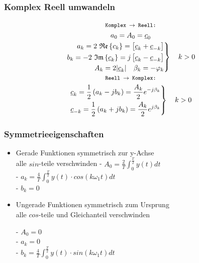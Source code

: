 \subsubsection{Komplex Reell umwandeln}
\begin{mdframed}[style=exercise]
    \begin{gather*}
    \texttt{\footnotesize Komplex $\rightarrow$ Reell:}\\
                a_0 = A_0 = \underline{c}_0\\
                \left.
                \begin{split}
                    a_k = 2\ \mathfrak{Re}\left\{ c_k \right\}= \left[ \underline{c}_k+\underline{c}_{-k} \right]\\
                    b_k = -2\ \mathfrak{Im}\left\{ \underline{c}_k \right\}= j\left[ \underline{c}_k-\underline{c}_{-k} \right]\\
                    A_k = 2|\underline{c}_k| \quad \beta_k = -\varphi_k
                \end{split}\right\} \quad k>0\\
    \texttt{\footnotesize Reell $\rightarrow$ Komplex:}\\
                \left.
                \begin{split}
                    \underline{c}_k = \frac{1}{2}\left( a_k-jb_k \right) = \frac{A_k}{2} e^{-j\beta_k}\\
                    \underline{c}_{-k} = \frac{1}{2}\left( a_k+jb_k \right) = \frac{A_k}{2} e^{j\beta_k}
                \end{split}\right\} \quad k>0\\
    \end{gather*}
\end{mdframed}

\subsubsection{Symmetrieeigenschaften}
\begin{itemize}
    \item Gerade Funktionen
        symmetrisch zur y-Achse\\
        alle $sin$-teile verschwinden
        - $A_0 = \frac{2}{T}\int^{\frac{T}{2}}_{0} y(t)dt$\\
        - $a_{k} = \frac{4}{T}\int^{\frac{T}{2}}_{0}y(t)\cdot cos(k\omega_1t)dt$\\
        - $b_k = 0$\\
    \item Ungerade Funktionen
        symmetrisch zum Ursprung\\
        alle $cos$-teile und Gleichanteil verschwinden

        - $A_0 = 0$\\
        - $a_k = 0$\\
        - $b_{k} = \frac{4}{T}\int^{\frac{T}{2}}_{0} y(t)\cdot sin(k\omega_1t)dt$\\
\end{itemize}
